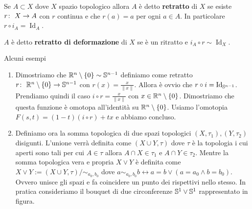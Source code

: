\begin{definition}
	Se $A \subset X$ dove $X$ spazio topologico allora $A$ è detto \textbf{retratto} di $X$ se esiste $\morphism{r}{X}{A}$ con $r$ continua e che $r(a) = a$ per ogni $a \in A$. In particolare $r \circ i_A = \operatorname{Id}_{A}$.
\end{definition}

\begin{definition}
	$A$ è detto \textbf{retratto di deformazione} di $X$ se è un ritratto e $i_A \circ r \sim \operatorname{Id}_{X}$.
\end{definition}


\begin{remark}
	Alcuni esempi
	\begin{enumerate}
		\item Dimostriamo che $\R^n \setminus \{0\} \sim \S^{n-1}$ definiamo come retratto $\morphism{r}{\R^n \setminus \{0\}}{\S^{n-1}}$ con $r(x) = \frac{x}{\|x\|}$. Allora è ovvio che $r \circ i = \operatorname{Id}_{\S^{n-1}}$. Prendiamo quindi il caso $i \circ r = \frac{x}{\|x\|}$ con $x \in \R^n  \setminus \{0\}$. Dimostriamo che questa funzione è omotopa all'identità su $\R^n \setminus \{0\}$. Usiamo l'omotopia $F(s,t) = (1-t)(i \circ r) + tx$ e abbiamo concluso.
		\item Definiamo ora la somma topologica di due spazi topologici $(X, \tau_1), (Y, \tau_2)$ disigunti. L'unione verrà definita come $(X \cup Y, \tau)$ dove $\tau$ è la topologia i cui aperti sono tali per cui $A \in \tau$ allora $A \cap X \in \tau_1$ e $A \cap Y \in \tau_2$. Mentre la somma topologica vera e propria $X \lor Y$ è definita come $X \lor Y := (X \cup Y, \tau) / \sim_{a_0, b_0}$ dove $ a \sim_{a_0, b_0} b \leftrightarrow a = b \lor (a = a_0 \land b = b_0)$. Ovvero unisce gli spazi e fa coincidere un punto dei rispettivi nello stesso. In pratica consideriamo il bouquet di due circonferenze $\S^1 \lor \S^1$ rappresentato in figura.
		

\end{enumerate}
\end{remark}
